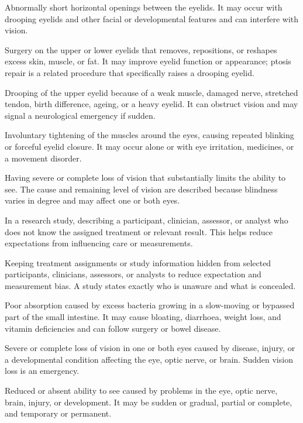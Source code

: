  Abnormally short horizontal openings between the eyelids. It may occur with drooping eyelids and other facial or developmental features and can interfere with vision.

 Surgery on the upper or lower eyelids that removes, repositions, or reshapes excess skin, muscle, or fat. It may improve eyelid function or appearance; ptosis repair is a related procedure that specifically raises a drooping eyelid.

 Drooping of the upper eyelid because of a weak muscle, damaged nerve, stretched tendon, birth difference, ageing, or a heavy eyelid. It can obstruct vision and may signal a neurological emergency if sudden.

 Involuntary tightening of the muscles around the eyes, causing repeated blinking or forceful eyelid closure. It may occur alone or with eye irritation, medicines, or a movement disorder.

 Having severe or complete loss of vision that substantially limits the ability to see. The cause and remaining level of vision are described because blindness varies in degree and may affect one or both eyes.

 In a research study, describing a participant, clinician, assessor, or analyst who does not know the assigned treatment or relevant result. This helps reduce expectations from influencing care or measurements.

 Keeping treatment assignments or study information hidden from selected participants, clinicians, assessors, or analysts to reduce expectation and measurement bias. A study states exactly who is unaware and what is concealed.

 Poor absorption caused by excess bacteria growing in a slow-moving or bypassed part of the small intestine. It may cause bloating, diarrhoea, weight loss, and vitamin deficiencies and can follow surgery or bowel disease.

 Severe or complete loss of vision in one or both eyes caused by disease, injury, or a developmental condition affecting the eye, optic nerve, or brain. Sudden vision loss is an emergency.

 Reduced or absent ability to see caused by problems in the eye, optic nerve, brain, injury, or development. It may be sudden or gradual, partial or complete, and temporary or permanent.

